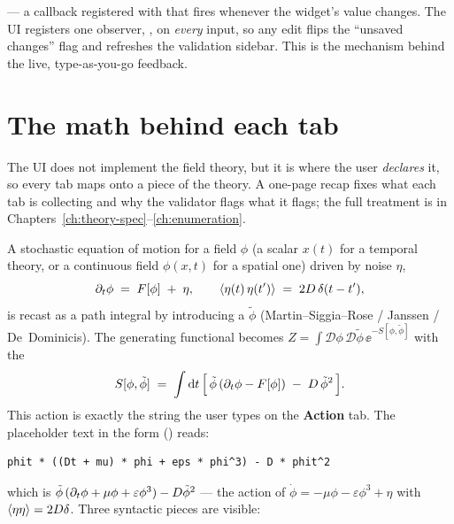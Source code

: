 \begin{defn}
 --- a callback registered with  that fires whenever the widget's value changes. The UI registers
one observer, , on \emph{every} input, so any edit flips the
``unsaved changes'' flag and refreshes the validation sidebar. This is the
mechanism behind the live, type-as-you-go feedback.
\end{defn}

\section{The math behind each tab}

The UI does not implement the \msrjd{} field theory, but it is where the user
\emph{declares} it, so every tab maps onto a piece of the theory. A one-page
recap fixes what each tab is collecting and why the validator flags what it flags;
the full treatment is in Chapters~\ref{ch:theory-spec}--\ref{ch:enumeration}.

A stochastic equation of motion for a field $\phi$ (a scalar $x(t)$ for a temporal
theory, or a continuous field $\phi(x,t)$ for a spatial one) driven by noise
$\eta$,
\begin{equation}
  \partial_t \phi \;=\; F[\phi] \;+\; \eta,
  \qquad \left\langle \eta(t)\,\eta(t') \right\rangle \;=\; 2D\,\delta(t-t'),
  \label{eq:ui-eom}
\end{equation}
is recast as a path integral by introducing a  $\tilde\phi$
(Martin--Siggia--Rose / Janssen / De~Dominicis). The generating functional becomes
$Z = \int \mathcal{D}\phi\,\mathcal{D}\tilde\phi\,\ee^{-S[\phi,\tilde\phi]}$ with
the \msrjd{} 
\begin{equation}
  S[\phi,\tilde\phi] \;=\; \int \mathrm{d} t\,\Big[\,\tilde\phi\,(\partial_t\phi - F[\phi])
        \;-\; D\,\tilde\phi^{2}\,\Big].
  \label{eq:ui-action}
\end{equation}
This action is exactly the string the user types on the \textbf{Action} tab. The
placeholder text in the form () reads:

\begin{lstlisting}[style=console]
phit * ((Dt + mu) * phi + eps * phi^3) - D * phit^2
\end{lstlisting}

which is $\tilde\phi\,(\partial_t\phi + \mu\phi + \varepsilon\phi^{3}) - D\tilde\phi^{2}$
--- the action of $\dot\phi = -\mu\phi - \varepsilon\phi^{3} + \eta$ with
$\left\langle \eta\eta \right\rangle = 2D\delta$. Three syntactic pieces are visible:

